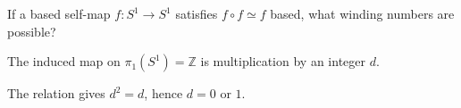 \begin{exercise}\label{exr:viii09-ped-16}
If a based self-map $f:S^1\to S^1$ satisfies $f\circ f\simeq f$ based, what winding numbers are possible?
\end{exercise}
\begin{hint}
The induced map on $\pi_1(S^1)=\mathbb Z$ is multiplication by an integer $d$.
\end{hint}
\begin{solution}
The relation gives $d^2=d$, hence $d=0$ or $1$.
\end{solution}

